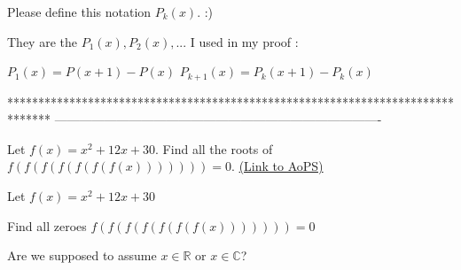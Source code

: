 \begin{solution}
	\begin{tcolorbox}Please define this notation $ P_{k}(x)$. :)\end{tcolorbox}

They are the $ P_1(x),P_2(x),...$ I used in my proof :

$ P_1(x)=P(x+1)-P(x)$
$ P_{k+1}(x)=P_k(x+1)-P_k(x)$
\end{solution}



*******************************************************************************
-------------------------------------------------------------------------------

\begin{problem}
	Let $ f(x)=x^2+12x+30$. Find all the roots of $ f(f(f(f(f(f(f(x)))))))=0$.
	\flushright \href{https://artofproblemsolving.com/community/c6h343978}{(Link to AoPS)}
\end{problem}



\begin{solution}
	\begin{tcolorbox}Let $ f(x) = x^2 + 12x + 30$

Find all zeroes $ f(f(f(f(f(f(f(x))))))) = 0$

 \end{tcolorbox}
Are we supposed to assume $ x \in \mathbb{R}$ or $ x \in \mathbb{C}$?
\end{solution}



